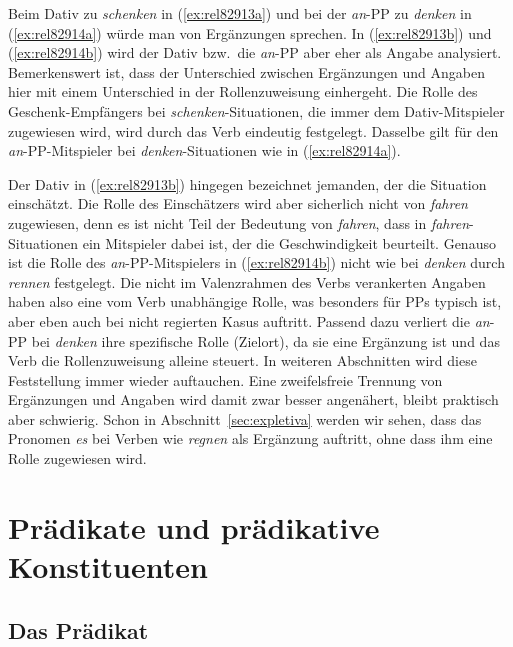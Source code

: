 Beim Dativ zu \textit{schenken} in (\ref{ex:rel82913a}) und bei der \textit{an}-PP zu \textit{denken} in (\ref{ex:rel82914a}) würde man von Ergänzungen sprechen.
In (\ref{ex:rel82913b}) und (\ref{ex:rel82914b}) wird der Dativ bzw.\ die \textit{an}-PP aber eher als Angabe analysiert.
Bemerkenswert ist, dass der Unterschied zwischen Ergänzungen und Angaben hier mit einem Unterschied in der Rollenzuweisung einhergeht.
Die Rolle des Geschenk-Empfängers bei \textit{schenken}-Situationen, die immer dem Dativ-Mitspieler zugewiesen wird, wird durch das Verb eindeutig festgelegt.
Dasselbe gilt für den \textit{an}-PP-Mitspieler bei \textit{denken}-Situationen wie in (\ref{ex:rel82914a}).

Der Dativ in (\ref{ex:rel82913b}) hingegen bezeichnet jemanden, der die Situation einschätzt.
Die Rolle des Einschätzers wird aber sicherlich nicht von \textit{fahren} zugewiesen, denn es ist nicht Teil der Bedeutung von \textit{fahren}, dass in \textit{fahren}-Situationen ein Mitspieler dabei ist, der die Geschwindigkeit beurteilt.
Genauso ist die Rolle des \textit{an}-PP-Mitspielers in (\ref{ex:rel82914b}) nicht wie bei \textit{denken} durch \textit{rennen} festgelegt.
Die nicht im Valenzrahmen des Verbs verankerten Angaben haben also eine vom Verb unabhängige Rolle, was besonders für PPs typisch ist, aber eben auch bei nicht regierten Kasus auftritt.
Passend dazu verliert die \textit{an}-PP bei \textit{denken} ihre spezifische Rolle (Zielort), da sie eine Ergänzung ist und das Verb die Rollenzuweisung alleine steuert.
In weiteren Abschnitten wird diese Feststellung immer wieder auftauchen.
Eine zweifelsfreie Trennung von Ergänzungen und Angaben wird damit zwar besser angenähert, bleibt praktisch aber schwierig.
Schon in Abschnitt~\ref{sec:expletiva} werden wir sehen, dass das Pronomen \textit{es} bei Verben wie \textit{regnen} als Ergänzung auftritt, ohne dass ihm eine Rolle zugewiesen wird.

\section{Prädikate und prädikative Konstituenten}

\label{sec:praedikat}

\subsection{Das Prädikat}



